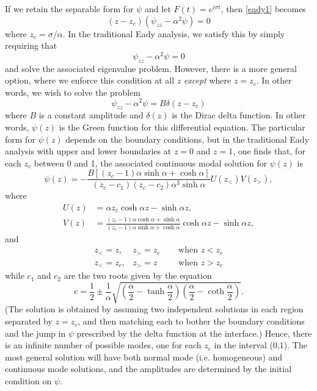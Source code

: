 \documentclass[letterpaper,11pt,onecolumn,twoside,titlepage]{article}
\begin{document}
If we retain the separable form for $\psi$ and let $F(t) = e^{i\sigma t}$, then \eqref{eady1} becomes
\[
(z- z_c)\left(\psi_{zz} - \alpha^2 \psi\right) = 0
\]
where $z_c = \sigma / \alpha$. In the traditional Eady analysis, we satisfy this by simply requiring that
\[
\psi_{zz} - \alpha^2 \psi = 0
\]
and solve the associated eigenvalue problem. However, there is a more general option, where we enforce this condition at all $z$ \emph{except} where $z = z_c$. In other words, we wish to solve the problem
\[
\psi_{zz} - \alpha^2 \psi = B \delta(z - z_c)
\]
where $B$ is a constant amplitude and $\delta(z)$ is the Dirac delta function. In other words, $\psi(z)$ is the Green function for this differential equation. The particular form for $\psi(z)$ depends on the boundary conditions, but in the traditional Eady analysis with upper and lower boundaries at $z = 0$ and $z = 1$, one finds that, for each $z_c$ between 0 and 1, the associated continuous modal solution for $\psi(z)$ is
\[
\psi(z) = -\frac{B[(z_c - 1)\alpha \sinh \alpha + \cosh \alpha]}{(z_c - c_1)(z_c- c_2) \alpha^3 \sinh \alpha} U(z_{\scriptscriptstyle <}) V(z_{\scriptscriptstyle >}),
\]
where
\begin{align*}
U(z) &= \alpha z_c \cosh \alpha z - \sinh \alpha z, \\
V(z) &= \frac{(z_c - 1) \alpha \cosh \alpha + \sinh \alpha}{(z_c - 1) \alpha \sinh \alpha + \cosh \alpha} \cosh \alpha z - \sinh \alpha z,
\end{align*}
and
\[
\begin{array}{lll}
z_{\scriptscriptstyle <} = z, & z_{\scriptscriptstyle >} = z_c & \quad \text{ when $z < z_c$} \\
z_{\scriptscriptstyle <} = z_c, & z_{\scriptscriptstyle >} = z & \quad \text{ when $z > z_c$}
\end{array}
\]
while $c_1$ and $c_2$ are the two roots given by the equation
\[
c = \frac{1}{2} \pm \frac{1}{\alpha} \sqrt{\left(\frac{\alpha}{2} - \tanh \frac{\alpha}{2}\right)\left(\frac{\alpha}{2} - \coth \frac{\alpha}{2}\right)}.
\]
(The solution is obtained by assuming two independent solutions in each region separated by $z=z_c$, and then matching each to bother the boundary conditions and the jump in $\psi$ prescribed by the delta function at the interface.) Hence, there is an infinite number of possible modes, one for each $z_c$ in the interval (0,1). The most general solution will have both normal mode (i.e. homogeneous) and continuous mode solutions, and the amplitudes are determined by the initial condition on $\psi$.
\end{document}
